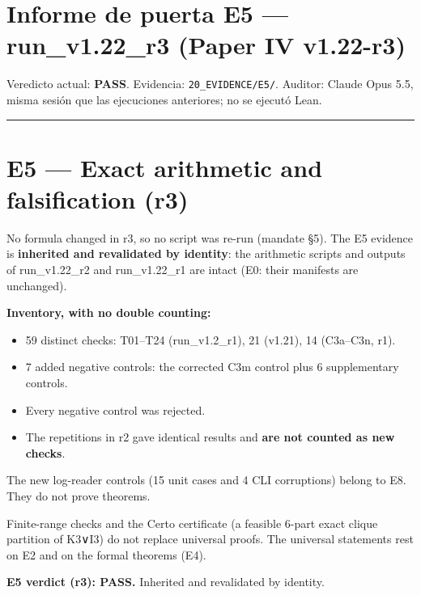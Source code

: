 \documentclass[
]{article}
\author{}
\date{}
\providecommand{\tightlist}{%
  \setlength{\itemsep}{0pt}\setlength{\parskip}{0pt}}
\begin{document}
\section{Informe de puerta E5 --- run\_v1.22\_r3 (Paper IV
v1.22-r3)}\label{informe-de-puerta-e5--run_v122_r3-paper-iv-v122-r3}

Veredicto actual: \textbf{PASS}. Evidencia: \texttt{20\_EVIDENCE/E5/}.
Auditor: Claude Opus 5.5, misma sesión que las ejecuciones anteriores;
no se ejecutó Lean.

\begin{center}\rule{0.5\linewidth}{0.5pt}\end{center}

\section{E5 --- Exact arithmetic and falsification
(r3)}\label{e5--exact-arithmetic-and-falsification-r3}

No formula changed in r3, so no script was re-run (mandate §5). The E5
evidence is \textbf{inherited and revalidated by identity}: the
arithmetic scripts and outputs of run\_v1.22\_r2 and run\_v1.22\_r1 are
intact (E0: their manifests are unchanged).

\textbf{Inventory, with no double counting:}

\begin{itemize}
\tightlist
\item
  59 distinct checks: T01--T24 (run\_v1.2\_r1), 21 (v1.21), 14
  (C3a--C3n, r1).
\item
  7 added negative controls: the corrected C3m control plus 6
  supplementary controls.
\item
  Every negative control was rejected.
\item
  The repetitions in r2 gave identical results and \textbf{are not
  counted as new checks}.
\end{itemize}

The new log-reader controls (15 unit cases and 4 CLI corruptions) belong
to E8. They do not prove theorems.

Finite-range checks and the Certo certificate (a feasible 6-part exact
clique partition of K3∨I3) do not replace universal proofs. The
universal statements rest on E2 and on the formal theorems (E4).

\textbf{E5 verdict (r3): PASS.} Inherited and revalidated by identity.
\end{document}
